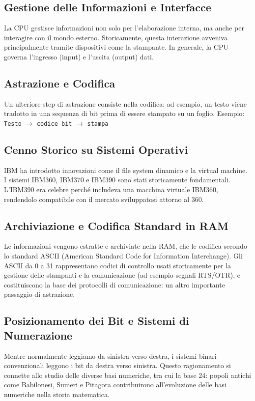 \documentclass{article}
\begin{document}
\subsection{Gestione delle Informazioni e Interfacce}
La CPU gestisce informazioni non solo per l'elaborazione interna, ma anche per interagire con il mondo esterno. Storicamente, questa interazione avveniva principalmente tramite dispositivi come la stampante. In generale, la CPU governa l'ingresso (input) e l'uscita (output) dati.

\subsection{Astrazione e Codifica}
Un ulteriore step di astrazione consiste nella codifica: ad esempio, un testo viene tradotto in una sequenza di bit prima di essere stampato su un foglio. \newline
\noindent Esempio: \texttt{Testo} $\rightarrow$ \texttt{codice bit} $\rightarrow$ \texttt{stampa}

\subsection{Cenno Storico su Sistemi Operativi}
IBM ha introdotto innovazioni come il file system dinamico e la virtual machine. I sistemi IBM360, IBM370 e IBM390 sono stati storicamente fondamentali. L'IBM390 era celebre perché includeva una macchina virtuale IBM360, rendendolo compatibile con il mercato sviluppatosi attorno al 360.

\subsection{Archiviazione e Codifica Standard in RAM}
Le informazioni vengono estratte e archiviate nella RAM, che le codifica secondo lo standard ASCII (American Standard Code for Information Interchange). Gli ASCII da 0 a 31 rappresentano codici di controllo usati storicamente per la gestione delle stampanti e la comunicazione (ad esempio segnali RTS/OTR), e costituiscono la base dei protocolli di comunicazione: un altro importante passaggio di astrazione.

\subsection{Posizionamento dei Bit e Sistemi di Numerazione}
Mentre normalmente leggiamo da sinistra verso destra, i sistemi binari convenzionali leggono i bit da destra verso sinistra. Questo ragionamento si connette allo studio delle diverse basi numeriche, tra cui la base 24: popoli antichi come Babilonesi, Sumeri e Pitagora contribuirono all'evoluzione delle basi numeriche nella storia matematica.
\end{document}
